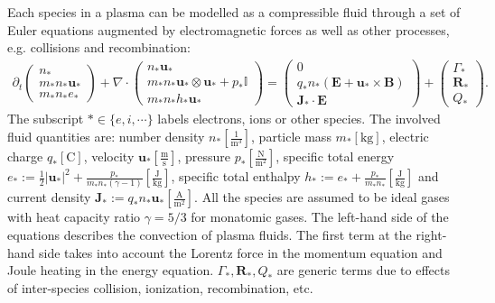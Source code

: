 \documentclass{article}
\begin{document}
Each species in a plasma can be modelled as a compressible fluid through a set of Euler equations augmented by electromagnetic forces as well as other processes, e.g. collisions and recombination:
\begin{align} \label{equ:euler_}
    \partial_t
    \begin{pmatrix}
    n_* \\
    m_*n_* \mathbf{u}_* \\
    m_*n_* e_*
    \end{pmatrix}
    + \nabla \cdot
    \begin{pmatrix}
    n_* \mathbf{u}_* \\
    m_*n_* \mathbf{u}_* \otimes \mathbf{u}_* + p_*\mathbb{I} \\
    m_*n_* h_* \mathbf{u}_*
    \end{pmatrix}
    =
    \begin{pmatrix}
    0 \\
    q_*n_*(\mathbf{E} + \mathbf{u}_* \times \mathbf{B}) \\
    \mathbf{J}_* \cdot \mathbf{E}
    \end{pmatrix}
    +
    \begin{pmatrix}
    \Gamma_* \\
    \mathbf{R}_* \\
    Q_*
    \end{pmatrix}.
\end{align}
The subscript $*\in \{e, i, \cdots\}$ labels electrons, ions or other species. The involved fluid quantities are: number density $n_*[\frac{1}{\text{m}^3}]$, particle mass $m_*[\text{kg}]$,  electric charge $q_*[\text{C}]$, velocity $\mathbf{u}_*[\frac{\text{m}}{\text{s}}]$, pressure $p_*[\frac{\text{N}}{\text{m}^2}]$, specific total energy $e_* := \frac{1}{2}|\mathbf{u}_*|^2 + \frac{p_*}{m_*n_*(\gamma - 1)}[\frac{\text{J}}{\text{kg}}]$, specific total enthalpy $h_* := e_* + \frac{p_*}{m_*n_*}[\frac{\text{J}}{\text{kg}}]$ and current density $\mathbf{J}_* := q_*n_*\mathbf{u}_*[\frac{\text{A}}{\text{m}^2}]$. All the species are assumed to be ideal gases with heat capacity ratio $\gamma=5/3$ for monatomic gases. The left-hand side of the equations describes the convection of plasma fluids. The first term at the right-hand side takes into account the Lorentz force in the momentum equation and Joule heating in the energy equation. $\Gamma_*, \mathbf{R}_*, Q_*$ are generic terms due to effects of inter-species collision, ionization, recombination, etc. 
\end{document}
